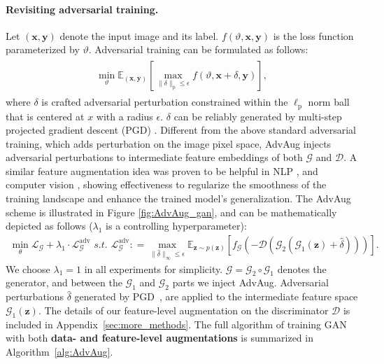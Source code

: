 \documentclass{article}
\newcommand{\Def}[0]{\mathrel{\mathop:}=}
\begin{document}
\paragraph{Revisiting adversarial training.} Let $(\boldsymbol{x},\boldsymbol{y})$ denote the input image and its label. $f(\vartheta,\boldsymbol{x},\boldsymbol{y})$ is the loss function parameterized by $\vartheta$. Adversarial training \cite{madry2017towards} can be formulated as follows:
\begin{align}
\begin{array}{ll}
\displaystyle \min_{\vartheta}\mathbb E_{(\boldsymbol{x}, \boldsymbol{y})} \displaystyle
\left[\max_{\|\delta\|_{\mathrm{p}}\le\epsilon}f(\vartheta,\boldsymbol{x}+\delta,\boldsymbol{y})\right],
\end{array}
\end{align}
where $\delta$ is crafted adversarial perturbation constrained within the $\ell_{\mathrm{p}}$ norm ball that is centered at $x$ with a radius $\epsilon$. $\delta$ can be reliably generated by multi-step projected gradient descent (PGD) \cite{madry2017towards}. Different from the above standard adversarial training, which adds perturbation on the image pixel space, AdvAug injects adversarial perturbations to intermediate feature embeddings of both $\mathcal{G}$ and $\mathcal{D}$. A similar feature augmentation idea was proven to be helpful in NLP \cite{zhu2019freelb}, and computer vision \cite{chen2021alfa}, showing effectiveness to regularize the smoothness of the training landscape and enhance the trained model's generalization. The AdvAug scheme is illustrated in Figure \ref{fig:AdvAug_gan}, and can be mathematically depicted as follows ($\lambda_1$ is a controlling hyperparameter): 
\begin{align}
\min_{\theta}\mathcal{L}_\mathcal{G}+\lambda_1\cdot\mathcal{L}^{\mathrm{adv}}_{\mathcal{G}} \,\, s.t. \,\, \mathcal{L}^{\mathrm{adv}}_{\mathcal{G}}\Def\max_{\|\hat\delta\|_{\infty}\le\epsilon}\mathbb{E}_{\boldsymbol{z}\sim p(\boldsymbol{z})}[f_{\mathcal{G}}(-\mathcal{D}(\mathcal{G}_2(\mathcal{G}_1(\boldsymbol{z})+\hat\delta)))].
\end{align}
We choose $\lambda_1=1$ in all experiments for simplicity. $\mathcal{G}=\mathcal{G}_2\circ\mathcal{G}_1$ denotes the generator, and between the $\mathcal{G}_1$ and $\mathcal{G}_2$ parts we inject AdvAug. Adversarial perturbations $\hat\delta$ generated by PGD~\cite{madry2017towards}, are applied to the intermediate feature space $\mathcal{G}_1(\boldsymbol{z})$. The details of our feature-level augmentation on the discriminator $\mathcal{D}$ is included in Appendix~\ref{sec:more_methods}. The full algorithm of training GAN with both \textbf{data- and feature-level augmentations} is summarized in Algorithm~\ref{alg:AdvAug}.
\end{document}
